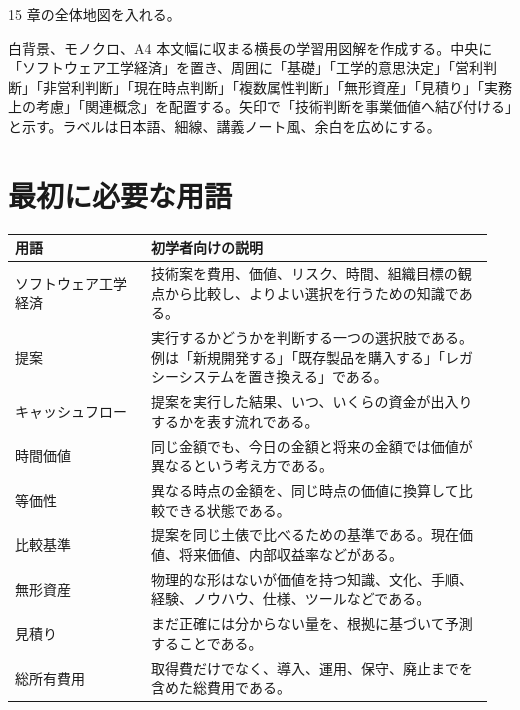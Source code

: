 \documentclass[a4paper,11pt]{article}
\begin{document}
\begin{todobox}
15 章の全体地図を入れる。
\end{todobox}
\begin{promptbox}
白背景、モノクロ、A4 本文幅に収まる横長の学習用図解を作成する。中央に「ソフトウェア工学経済」を置き、周囲に「基礎」「工学的意思決定」「営利判断」「非営利判断」「現在時点判断」「複数属性判断」「無形資産」「見積り」「実務上の考慮」「関連概念」を配置する。矢印で「技術判断を事業価値へ結び付ける」と示す。ラベルは日本語、細線、講義ノート風、余白を広めにする。
\end{promptbox}

\section*{最初に必要な用語}

\begin{longtable}{L{0.27\linewidth} L{0.68\linewidth}}
\toprule
\textbf{用語} & \textbf{初学者向けの説明} \\
\midrule
ソフトウェア工学経済 & 技術案を費用、価値、リスク、時間、組織目標の観点から比較し、よりよい選択を行うための知識である。 \\
提案 & 実行するかどうかを判断する一つの選択肢である。例は「新規開発する」「既存製品を購入する」「レガシーシステムを置き換える」である。 \\
キャッシュフロー & 提案を実行した結果、いつ、いくらの資金が出入りするかを表す流れである。 \\
時間価値 & 同じ金額でも、今日の金額と将来の金額では価値が異なるという考え方である。 \\
等価性 & 異なる時点の金額を、同じ時点の価値に換算して比較できる状態である。 \\
比較基準 & 提案を同じ土俵で比べるための基準である。現在価値、将来価値、内部収益率などがある。 \\
無形資産 & 物理的な形はないが価値を持つ知識、文化、手順、経験、ノウハウ、仕様、ツールなどである。 \\
見積り & まだ正確には分からない量を、根拠に基づいて予測することである。 \\
総所有費用 & 取得費だけでなく、導入、運用、保守、廃止までを含めた総費用である。 \\
\bottomrule
\end{longtable}
\end{document}
